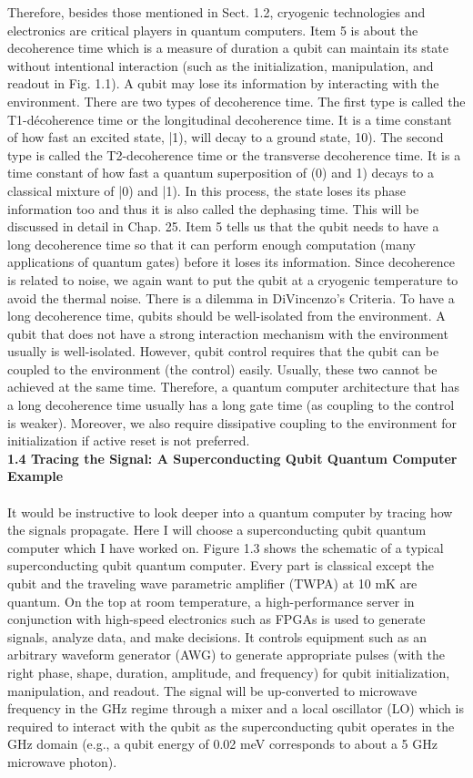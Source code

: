 \documentclass{article}
\begin{document}
Therefore, besides those mentioned in Sect. 1.2, cryogenic technologies and electronics are critical players in quantum computers.
Item 5 is about the decoherence time which is a measure of duration a qubit can maintain its state without intentional interaction (such as the initialization, manipulation, and readout in Fig. 1.1). A qubit may lose its information by interacting with the environment. There are two types of decoherence time. The first type is called the T1-décoherence time or the longitudinal decoherence time. It is a time constant of how fast an excited state, |1), will decay to a ground state, 10). The second type is called the T2-decoherence time or the transverse decoherence time.
It is a time constant of how fast a quantum superposition of (0) and 1) decays to a classical mixture of |0) and |1). In this process, the state loses its phase information too and thus it is also called the dephasing time. This will be discussed in detail in Chap. 25.
Item 5 tells us that the qubit needs to have a long decoherence time so that it can perform enough computation (many applications of quantum gates) before it loses its information. Since decoherence is related to noise, we again want to put the qubit at a cryogenic temperature to avoid the thermal noise.
There is a dilemma in DiVincenzo's Criteria. To have a long decoherence time, qubits should be well-isolated from the environment. A qubit that does not have a strong interaction mechanism with the environment usually is well-isolated.
However, qubit control requires that the qubit can be coupled to the environment (the control) easily. Usually, these two cannot be achieved at the same time. Therefore, a quantum computer architecture that has a long decoherence time usually has a long gate time (as coupling to the control is weaker). Moreover, we also require dissipative coupling to the environment for initialization if active reset is not preferred.
\\[20pt]
\textbf{\large 1.4 Tracing the Signal: A Superconducting Qubit Quantum Computer Example
}\\\\
It would be instructive to look deeper into a quantum computer by tracing how the signals propagate. Here I will choose a superconducting qubit quantum computer which I have worked on. Figure 1.3 shows the schematic of a typical
superconducting qubit quantum computer. Every part is classical except the qubit and the traveling wave parametric amplifier (TWPA) at 10 mK are quantum.
On the top at room temperature, a high-performance server in conjunction with high-speed electronics such as FPGAs is used to generate signals, analyze data, and make decisions. It controls equipment such as an arbitrary waveform generator (AWG) to generate appropriate pulses (with the right phase, shape, duration, amplitude, and frequency) for qubit initialization, manipulation, and readout. The signal will be up-converted to microwave frequency in the GHz regime through a mixer and a local oscillator (LO) which is required to interact with the qubit as the superconducting qubit operates in the GHz domain (e.g., a qubit energy of 0.02 meV corresponds to about a 5 GHz microwave photon).
\end{document}
